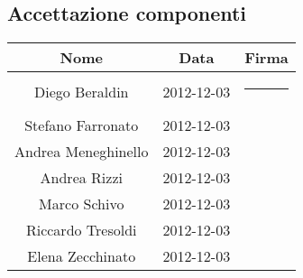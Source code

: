 \subsection{Accettazione componenti}
\begin{center}
\begin{tabularx}{0.9\textwidth}{c|c|c}
{\bf Nome}&{\bf Data}&{\bf Firma }\\ 
\hline
\multirow{2}{*}{Diego Beraldin} & \multirow{2}{*}{2012-12-03}&\rule{3cm}{0cm}\\&&\\
\multirow{2}{*}{Stefano Farronato} &\multirow{2}{*}{2012-12-03}&\\&&\\
\multirow{2}{*}{Andrea Meneghinello} &\multirow{2}{*}{2012-12-03}&\\&&\\
\multirow{2}{*}{Andrea Rizzi} &\multirow{2}{*}{2012-12-03}&\\&&\\
\multirow{2}{*}{Marco Schivo} &\multirow{2}{*}{2012-12-03}&\\&&\\
\multirow{2}{*}{Riccardo Tresoldi} &\multirow{2}{*}{2012-12-03}&\\&&\\
\multirow{2}{*}{Elena Zecchinato}&\multirow{2}{*}{2012-12-03}&\\&&\\
\end{tabularx}
\end{center}

